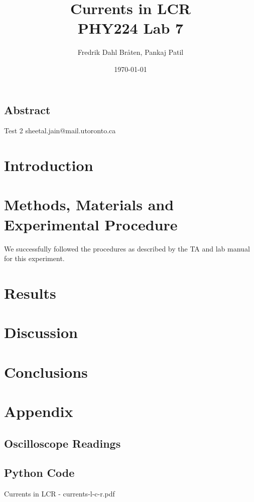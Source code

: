 \documentclass[a4paper,12pt]{article}
\begin{document}
\title{%
Currents in LCR \\
\large PHY224 Lab 7}
\author{Fredrik Dahl Bråten, Pankaj Patil}
\date{\today}
\maketitle


\begin{center}
	\section*{Abstract}
	Test 2
	sheetal.jain@mail.utoronto.ca
\end{center}

\section{Introduction}


\section{Methods, Materials and Experimental Procedure}

We successfully followed the procedures as described by the TA and lab manual \cite{lab-manual-ex7} for this experiment.

\section{Results}



\section{Discussion}

\section{Conclusions}

\pagebreak

\appendix

\section{Appendix}

\subsection{Oscilloscope Readings}

\pagebreak

\subsection{Python Code}


\pagebreak

\begin{thebibliography}{99}

 Currents in LCR - currents-l-c-r.pdf

\end{thebibliography}
\end{document}
